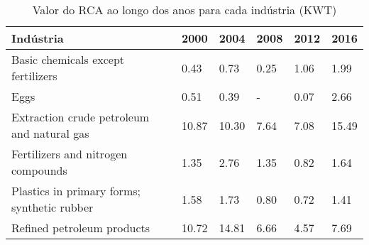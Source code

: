 \begin{table}
\centering
\caption{Valor do RCA ao longo dos anos para cada indústria (KWT)}
\begin{tabular}{p{6cm}p{1.5cm}p{1.5cm}p{1.5cm}p{1.5cm}p{1.5cm}}
\toprule
                                  Indústria &  2000 &  2004 & 2008 & 2012 &  2016 \\
\midrule
         Basic chemicals except fertilizers &  0.43 &  0.73 & 0.25 & 1.06 &  1.99 \\
                                       Eggs &  0.51 &  0.39 &    - & 0.07 &  2.66 \\
 Extraction crude petroleum and natural gas & 10.87 & 10.30 & 7.64 & 7.08 & 15.49 \\
         Fertilizers and nitrogen compounds &  1.35 &  2.76 & 1.35 & 0.82 &  1.64 \\
Plastics in primary forms; synthetic rubber &  1.58 &  1.73 & 0.80 & 0.72 &  1.41 \\
                 Refined petroleum products & 10.72 & 14.81 & 6.66 & 4.57 &  7.69 \\
\bottomrule
\end{tabular}
\end{table}
